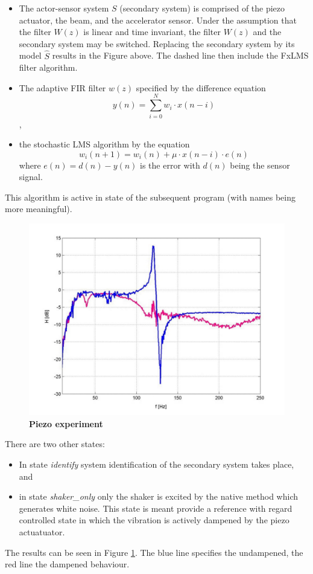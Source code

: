 \begin{itemize}
\item The actor-sensor system $S$ (secondary system) is comprised of the piezo actuator, the beam, and the accelerator sensor. Under the assumption that the filter $W(z)$ is 
linear and time invariant, the filter $W(z)$ and the secondary system may be switched. 
Replacing the secondary system by its model $\hat{S}$ results in the Figure above. 
The dashed line then include the FxLMS filter algorithm.

\item The adaptive FIR filter $w(z)$ specified
 by the difference equation $$y(n) = \sum_{i=0}^N w_{i} \cdot x(n-i)$$,

\item the stochastic LMS algorithm by the equation
$$w_{i}(n+1) = w_{i}(n) + \mu \cdot x(n-i) \cdot e(n)$$
where $e(n) = d(n) - y(n)$  is the error with $d(n)$ being the sensor signal.
\end{itemize}

This algorithm is active in state  of the subsequent
program (with names being more meaningful). 
%
%
\begin{figure}[htbp]
\begin{center}
\includegraphics[scale=0.25]{../pdf/dampening}
\caption{{\bf Piezo experiment}\label{dampening}}
\end{center}
\end{figure}

There are two other states:
\begin{itemize}
  \item In state \emph{identify} system identification of the secondary
       system takes place, and

  \item in state \emph{shaker\_only} only the shaker is excited by the 
    native method  which generates white noise. This state is meant
    provide a reference with regard controlled state in which the vibration is
    actively dampened by the piezo actuatuator. 
\end{itemize}
The results can be seen in Figure \ref{dampening}. The blue line specifies the undampened, the red line the dampened behaviour.

